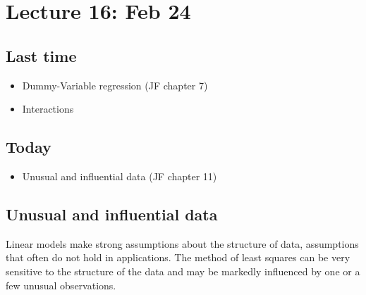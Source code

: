 \setcounter{section}{15}


\section{Lecture 16: Feb 24}


\subsection*{Last time}
\begin{itemize}
 \item Dummy-Variable regression (JF chapter 7)
 \item Interactions
\end{itemize}


\subsection*{Today}
\begin{itemize}
 \item Unusual and influential data (JF chapter 11)
\end{itemize}

\subsection*{Unusual and influential data}

Linear models make strong assumptions about the structure of data, assumptions that often do not hold in applications.
The method of least squares can be very sensitive to the structure of the data and may be markedly influenced by one or a few unusual observations.

